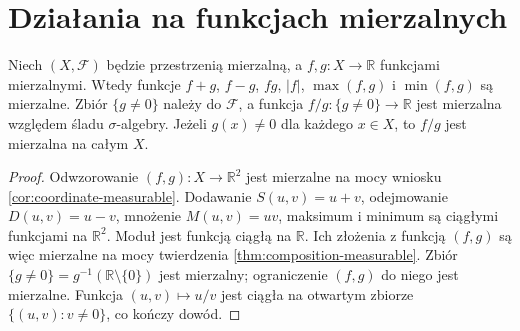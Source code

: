 \section{Działania na funkcjach mierzalnych}

\begin{twierdzenie}
\label{thm:measurable-algebra}
Niech $(X,\mathcal F)$ będzie przestrzenią mierzalną,
a $f,g:X\to\mathbb R$ funkcjami mierzalnymi.
Wtedy funkcje $f+g$, $f-g$, $fg$, $|f|$,
$\max(f,g)$ i $\min(f,g)$ są mierzalne.
Zbiór $\{g\ne0\}$ należy do $\mathcal F$, a
funkcja $f/g:\{g\ne0\}\to\mathbb R$ jest mierzalna
względem śladu $\sigma$-algebry. Jeżeli $g(x)\ne0$
dla każdego $x\in X$, to $f/g$ jest mierzalna na całym $X$.
\end{twierdzenie}
\begin{proof}
Odwzorowanie $(f,g):X\to\mathbb R^2$ jest mierzalne
na mocy wniosku \ref{cor:coordinate-measurable}.
Dodawanie $S(u,v)=u+v$, odejmowanie $D(u,v)=u-v$,
mnożenie $M(u,v)=uv$, maksimum i minimum są ciągłymi
funkcjami na $\mathbb R^2$. Moduł jest funkcją ciągłą
na $\mathbb R$. Ich złożenia z funkcją $(f,g)$ są
więc mierzalne na mocy twierdzenia
\ref{thm:composition-measurable}.
Zbiór $\{g\ne0\}=g^{-1}(\mathbb R\setminus\{0\})$
jest mierzalny; ograniczenie $(f,g)$ do niego jest
mierzalne. Funkcja $(u,v)\mapsto u/v$ jest ciągła
na otwartym zbiorze $\{(u,v):v\ne0\}$, co kończy dowód.
\end{proof}

